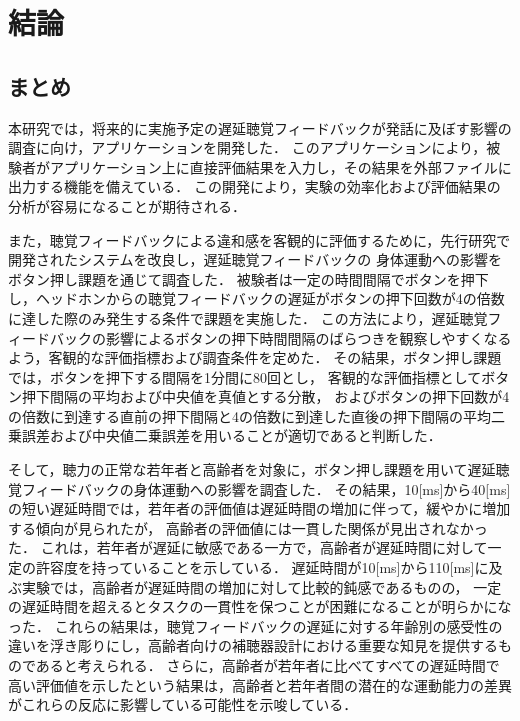 \chapter{結論}
\section{まとめ}
本研究では，将来的に実施予定の遅延聴覚フィードバックが発話に及ぼす影響の調査に向け，アプリケーションを開発した．
このアプリケーションにより，被験者がアプリケーション上に直接評価結果を入力し，その結果を外部ファイルに出力する機能を備えている．
この開発により，実験の効率化および評価結果の分析が容易になることが期待される．

また，聴覚フィードバックによる違和感を客観的に評価するために，先行研究\cite{shigematu}で開発されたシステムを改良し，遅延聴覚フィードバックの
身体運動への影響をボタン押し課題を通じて調査した．
被験者は一定の時間間隔でボタンを押下し，ヘッドホンからの聴覚フィードバックの遅延がボタンの押下回数が4の倍数に達した際のみ発生する条件で課題を実施した．
この方法により，遅延聴覚フィードバックの影響によるボタンの押下時間間隔のばらつきを観察しやすくなるよう，客観的な評価指標および調査条件を定めた．
その結果，ボタン押し課題では，ボタンを押下する間隔を1分間に80回とし，
客観的な評価指標としてボタン押下間隔の平均および中央値を真値とする分散，
およびボタンの押下回数が4の倍数に到達する直前の押下間隔と4の倍数に到達した直後の押下間隔の平均二乗誤差および中央値二乗誤差を用いることが適切であると判断した．

そして，聴力の正常な若年者と高齢者を対象に，ボタン押し課題を用いて遅延聴覚フィードバックの身体運動への影響を調査した．
その結果，10[ms]から40[ms]の短い遅延時間では，若年者の評価値は遅延時間の増加に伴って，緩やかに増加する傾向が見られたが，
高齢者の評価値には一貫した関係が見出されなかった．
これは，若年者が遅延に敏感である一方で，高齢者が遅延時間に対して一定の許容度を持っていることを示している．
遅延時間が10[ms]から110[ms]に及ぶ実験では，高齢者が遅延時間の増加に対して比較的鈍感であるものの，
一定の遅延時間を超えるとタスクの一貫性を保つことが困難になることが明らかになった．
これらの結果は，聴覚フィードバックの遅延に対する年齢別の感受性の違いを浮き彫りにし，高齢者向けの補聴器設計における重要な知見を提供するものであると考えられる．
さらに，高齢者が若年者に比べてすべての遅延時間で高い評価値を示したという結果は，高齢者と若年者間の潜在的な運動能力の差異がこれらの反応に影響している可能性を示唆している．
